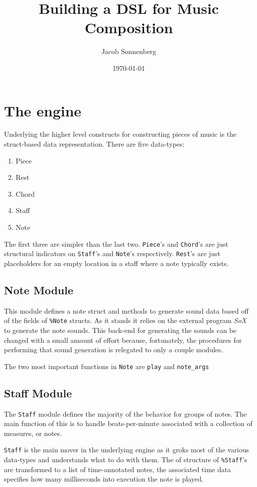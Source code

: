 \documentclass[11pt]{article}
\author{Jacob Sonnenberg}
\date{\today}
\title{Building a DSL for Music Composition}
\begin{document}
\maketitle
\tableofcontents

\section{The engine}
\label{sec-1}
Underlying the higher level constructs for constructing pieces of
music is the struct-based data representation. There are five
data-types:
\begin{enumerate}
\item Piece
\item Rest
\item Chord
\item Staff
\item Note
\end{enumerate}
The first three are simpler than the last two. \verb~Piece~'s and
\verb~Chord~'s are just structural indicators on \verb~Staff~'s and \verb~Note~'s
respectively. \verb~Rest~'s are just placeholders for an empty location
in a staff where a note typically exists.

\subsection{Note Module}
\label{sec-1-1}
This module defines a note struct and methods to generate sound
data based off of the fields of \verb~%Note~ structs. As it stands it
relies on the external program \emph{SoX} to generate the note
sounds. This back-end for generating the sounds can be changed with
a small amount of effort because, fortunately, the procedures for
performing that sound generation is relegated to only a couple
modules.

The two most important functions in \verb~Note~ are \texttt{play} and
\texttt{note\_args}

\subsection{Staff Module}
\label{sec-1-2}
The \verb~Staff~ module defines the majority of the behavior for groups
of notes. The main function of this is to handle beats-per-minute
associated with a collection of measures, or notes.

\verb~Staff~ is the main mover in the underlying engine as it groks most
of the various data-types and understands what to do with
them. The of structure of \verb~%Staff~'s are transformed to
a list of time-annotated notes, the associated time data specifies
how many milliseconds into execution the note is played. 
\end{document}
